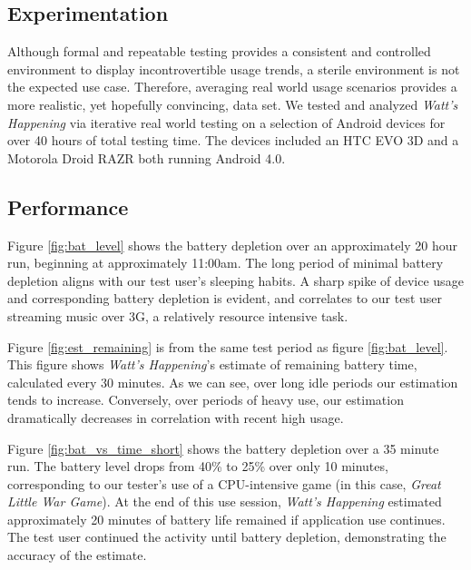 \subsection{Experimentation}
Although formal and repeatable testing provides a consistent and controlled environment to display incontrovertible usage trends, a sterile environment is not the expected use case.
Therefore, averaging real world usage scenarios provides a more realistic, yet hopefully convincing, data set.
We tested and analyzed \emph{Watt's Happening} via iterative real world testing on a selection of Android devices for over 40 hours of total testing time.
The devices included an HTC EVO 3D and a Motorola Droid RAZR both running Android 4.0. 

\subsection{Performance}
Figure \ref{fig:bat_level} shows the battery depletion over an approximately 20 hour run, beginning at approximately 11:00am. 
The long period of minimal battery depletion aligns with our test user's sleeping habits.
A sharp spike of device usage and corresponding battery depletion is evident, and correlates to our test user streaming music over 3G, a relatively resource intensive task.

Figure \ref{fig:est_remaining} is from the same test period as figure \ref{fig:bat_level}.
This figure shows \emph{Watt's Happening}'s estimate of remaining battery time, calculated every 30 minutes.
As we can see, over long idle periods our estimation tends to increase.
Conversely, over periods of heavy use, our estimation dramatically decreases in correlation with recent high usage.

Figure \ref{fig:bat_vs_time_short} shows the battery depletion over a 35 minute run.
The battery level drops from 40\% to 25\% over only 10 minutes, corresponding to our tester's use of a CPU-intensive game (in this case, \emph{Great Little War Game}\cite{glwg}).
At the end of this use session, \emph{Watt's Happening} estimated approximately 20 minutes of battery life remained if application use continues.
The test user continued the activity until battery depletion, demonstrating the accuracy of the estimate.

